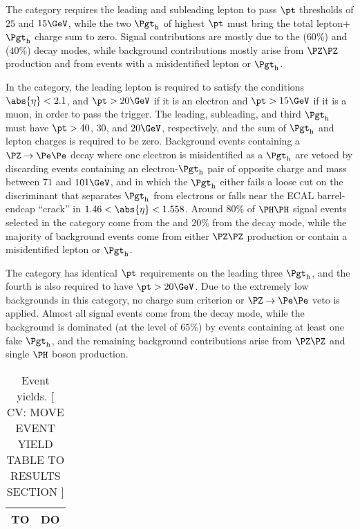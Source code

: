 The \lltt category requires
the leading and subleading lepton to pass $\pt$ thresholds of $25$ and $15\GeV$, 
while the two $\tauh$ of highest $\pt$ must bring the total lepton+$\tauh$ charge sum to zero.
Signal contributions are mostly due to the \WWtt ($60\%$) and \tttt ($40\%$) decay modes, 
while background contributions mostly arise from $\PZ\PZ$ production and from events with a misidentified lepton or $\tauh$.

In the \lttt category,
the leading lepton is required to satisfy the conditions 
$\abs{\eta} < 2.1$, and $\pt > 20\GeV$ if it is an electron and $\pt > 15\GeV$ if it is a muon,
in order to pass the trigger.
The leading, subleading, and third
$\tauh$ must have $\pt > 40$, $30$, and $20\GeV$, respectively, and the sum of $\tauh$ and lepton charges is required to be zero.
Background events containing a $\Zee$ decay where one electron is misidentified
as a $\tauh$ are vetoed by discarding events containing an electron-$\tauh$ pair of opposite charge
and mass between $71$ and $101\GeV$, and in which the $\tauh$ either fails a loose cut on the discriminant that separates $\tauh$ from electrons
or falls near the ECAL barrel-endcap ``crack'' in $1.46 < \abs{\eta} < 1.558$.  Around $80\%$ of $\HH$ signal events selected in the \lttt category
come from the \tttt and $20\%$ from the \WWtt decay mode, while the majority of
background events come from either $\PZ\PZ$ production or contain a misidentified lepton or $\tauh$.

The \noltttt category has identical $\pt$ requirements on the leading three $\tauh$,
and the fourth \tauh is also required to have $\pt > 20\GeV$.  Due to the extremely
low backgrounds in this category, no charge sum criterion or $\Zee$ veto is applied.  Almost
all signal events come from the \tttt decay mode, while the background is dominated (at the level of $65\%$) by events 
containing at least one fake $\tauh$, and the remaining background contributions arise from $\PZ\PZ$ and single
$\PHiggs$ boson production.

\begin{table}[!h]
\begin{center}
\begin{tabular}{|c|c|}

\hline
TO & DO \\
\hline

\end{tabular}
\end{center}
\caption{
  Event yields. [ CV: MOVE EVENT YIELD TABLE TO RESULTS SECTION ]
}
\label{tab:event_yields}
\end{table}

